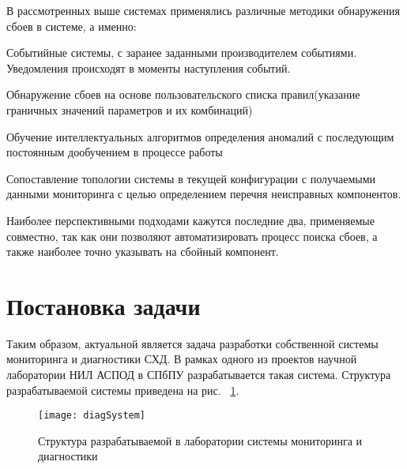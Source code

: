 В рассмотренных выше системах применялись различные методики обнаружения сбоев в системе, а именно:
\begin{itemize*}
	\item{Событийные системы, с заранее заданными производителем событиями. Уведомления происходят в моменты наступления событий.}
	\item{Обнаружение сбоев на основе пользовательского списка правил(указание граничных значений параметров и их комбинаций)}
	\item{Обучение интеллектуальных алгоритмов определения аномалий с последующим постоянным дообучением в процессе работы}
	\item{Сопоставление топологии системы в текущей конфигурации с получаемыми данными мониторинга с целью определением перечня неисправных компонентов.}
\end{itemize*}
Наиболее перспективными подходами кажутся последние два, применяемые совместно, так как они позволяют автоматизировать процесс поиска сбоев, а также наиболее точно указывать на сбойный компонент. 

\section{Постановка задачи}

Таким образом, актуальной является задача разработки собственной системы мониторинга и диагностики СХД. В рамках одного из проектов научной лаборатории НИЛ АСПОД в СПбПУ разрабатывается такая система. Структура разрабатываемой системы приведена на рис. ~\ref{fig:diagSystem}.
\begin{figure}[!h]
	\centering
	\texttt{[image: diagSystem]}
	\caption{Структура разрабатываемой в лаборатории системы мониторинга и диагностики}
	\label{fig:diagSystem}
\end{figure}

